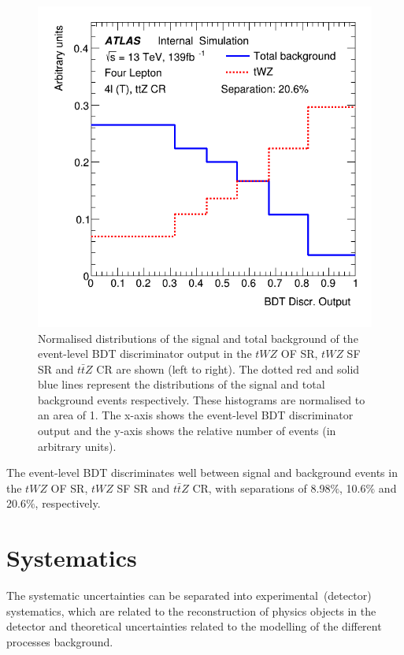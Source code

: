 \begin{figure}[h!]
	\includegraphics[scale=0.27]{figures/lep4_ttZ_4T.png}
	\centering
	\caption{Normalised distributions of the signal and total background of the event-level BDT discriminator output in the $tWZ$ OF SR, $tWZ$ SF SR and $t\bar{t}Z$ CR are shown (left to right). The dotted red and solid blue lines represent the distributions of the signal and total background events respectively. These histograms are normalised to an area of 1. The x-axis shows the event-level BDT discriminator output and the y-axis shows the relative number of events (in arbitrary units).}
	\label{fig:2vsm-normdists}
\end{figure}

The event-level BDT discriminates well between signal and background events in the $tWZ$ OF SR, $tWZ$ SF SR and $t\bar{t}Z$ CR, with separations of 8.98$\%$, 10.6$\%$ and 20.6$\%$, respectively.





\section{Systematics}
\label{sec:systematics}

The systematic uncertainties can be separated into experimental~(detector) systematics, which are related to the reconstruction of physics objects in the detector and theoretical uncertainties related to the modelling of the different processes background.

